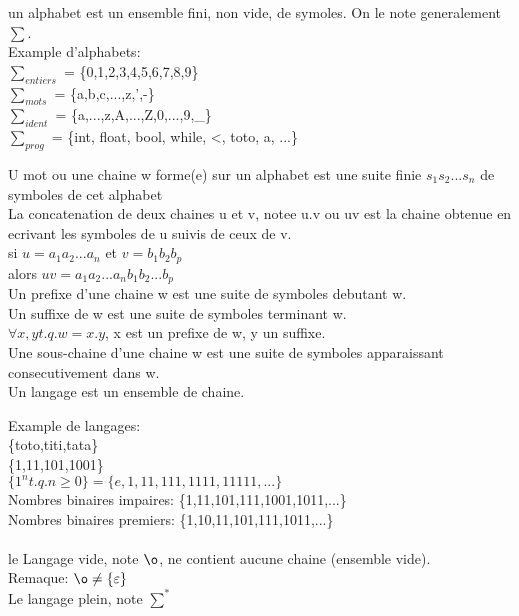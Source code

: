 \documentclass{article}
\begin{document}
un alphabet est un ensemble fini, non vide, de symoles. On le note generalement $\sum$.\\
Example d'alphabets:\\
$\sum_{entiers}$ = \{0,1,2,3,4,5,6,7,8,9\}\\
$\sum_{mots}$ = \{a,b,c,...,z,',-\}\\
$\sum_{ident}$ = \{a,...,z,A,...,Z,0,...,9,\_\}\\
$\sum_{prog}$ = \{int, float, bool, while, <, toto, a, ...\}

U mot ou une chaine w forme(e) sur un alphabet est une suite finie $s_1 s_2 ... s_n$ de symboles de cet alphabet\\


La concatenation de deux chaines u et v, notee u.v ou uv est la chaine obtenue en ecrivant les symboles de u suivis de ceux de v.\\
si $u=a_1 a_2 ... a_n$ et $v=b_1 b_2 b_p$\\
alors $uv=a_1 a_2 ... a_n b_1 b_2 ... b_p$\\

Un prefixe d'une chaine w est une suite de symboles debutant w.\\
Un suffixe de w est une suite de symboles terminant w.\\
$\forall x,y t.q. w=x.y$, x est un prefixe de w, y un suffixe.\\

Une sous-chaine d'une chaine w est une suite de symboles apparaissant consecutivement dans w.\\

Un langage est un ensemble de chaine.

Example de langages:\\
\{toto,titi,tata\}\\
\{1,11,101,1001\}\\
$\{1^n t.q. n \geq 0\} = \{e,1,11,111,1111,11111,...\}$\\
Nombres binaires impaires: \{1,11,101,111,1001,1011,...\}\\
Nombres binaires premiers: \{1,10,11,101,111,1011,...\}\\
\\
le Langage vide, note $\o$, ne contient aucune chaine (ensemble vide).\\

Remaque: $\o \ne \{\varepsilon\}$\\
Le langage plein, note $\sum^*$\\
\end{document}

